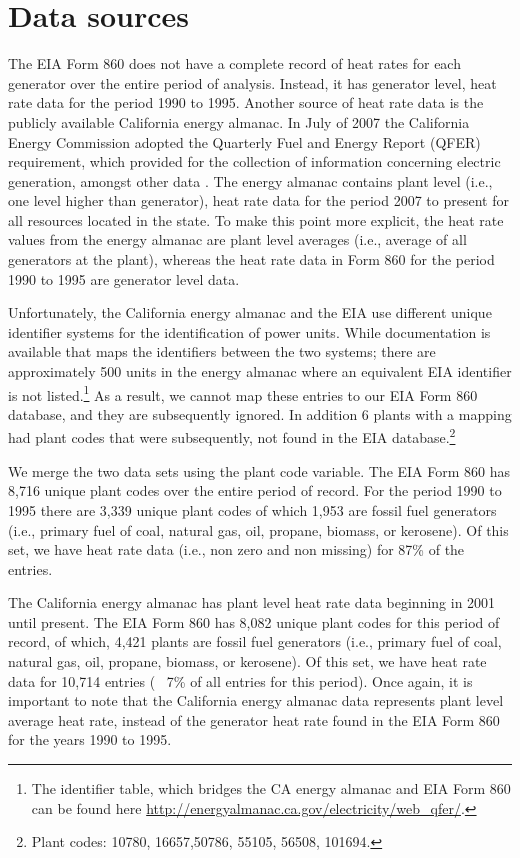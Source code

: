\documentclass[10pt]{report}
\begin{document}
\section{Data sources}
The EIA Form 860 does not have a complete record of heat rates for each generator over the entire period of analysis. 
Instead, it has generator level, heat rate data for the period 1990 to 1995. 
Another source of heat rate data is the publicly available California energy almanac.
In July of 2007 the California Energy Commission adopted the Quarterly Fuel and Energy Report (QFER) requirement, which provided for the collection of information concerning electric generation, amongst other data \parencite{cec2016}. 
The energy almanac contains plant level (i.e., one level higher than generator), heat rate data for the period 2007 to present for all resources located in the state.  
To make this point more explicit, the heat rate values from the energy almanac are plant level averages (i.e., average of all generators at the plant), whereas the heat rate data in Form 860 for the period 1990 to 1995 are generator level data.   

Unfortunately, the California energy almanac and the EIA use different unique identifier systems for the identification of power units. 
While documentation is available that maps the identifiers between the two systems; there are approximately 500 units in the energy almanac where an equivalent EIA identifier is not listed.\footnote{The identifier table, which bridges the CA energy almanac and EIA Form 860 can be found here \url{http://energyalmanac.ca.gov/electricity/web_qfer/}.} 
As a result, we cannot map these entries to our EIA Form 860 database, and they are subsequently ignored.
In addition 6 plants with a mapping had plant codes that were subsequently, not found in the EIA database.\footnote{Plant codes: 10780, 16657,50786, 55105, 56508, 101694.}

We merge the two data sets using the plant code variable. 
The EIA Form 860 has 8,716 unique plant codes over the entire period of record.
For the period 1990 to 1995 there are 3,339 unique plant codes of which 1,953 are fossil fuel generators (i.e., primary fuel of coal, natural gas, oil, propane, biomass, or kerosene).
Of this set, we have heat rate data (i.e., non zero and non missing) for 87\% of the entries.

The California energy almanac has plant level heat rate data beginning in 2001 until present.
The EIA Form 860 has 8,082 unique plant codes for this period of record, of which, 4,421 plants are fossil fuel generators (i.e., primary fuel of coal, natural gas, oil, propane, biomass, or kerosene).
Of this set, we have heat rate data for 10,714 entries (~ 7\% of all entries for this period). 
Once again, it is important to note that the California energy almanac data represents plant level average heat rate, instead of the generator heat rate found in the EIA Form 860 for the years 1990 to 1995. 
\end{document}
